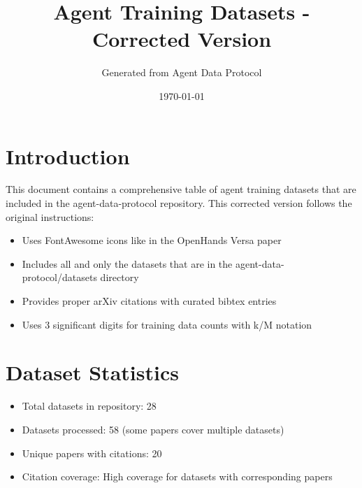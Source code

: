 \documentclass[11pt]{article}
\title{Agent Training Datasets - Corrected Version}
\author{Generated from Agent Data Protocol}
\date{\today}
\begin{document}
\maketitle

\section{Introduction}

This document contains a comprehensive table of agent training datasets that are included in the agent-data-protocol repository. This corrected version follows the original instructions:

\begin{itemize}
\item Uses FontAwesome icons like in the OpenHands Versa paper
\item Includes all and only the datasets that are in the agent-data-protocol/datasets directory
\item Provides proper arXiv citations with curated bibtex entries
\item Uses 3 significant digits for training data counts with k/M notation
\end{itemize}

\section{Dataset Statistics}

\begin{itemize}
\item Total datasets in repository: 28
\item Datasets processed: 58 (some papers cover multiple datasets)
\item Unique papers with citations: 20
\item Citation coverage: High coverage for datasets with corresponding papers
\end{itemize}





\end{document}

